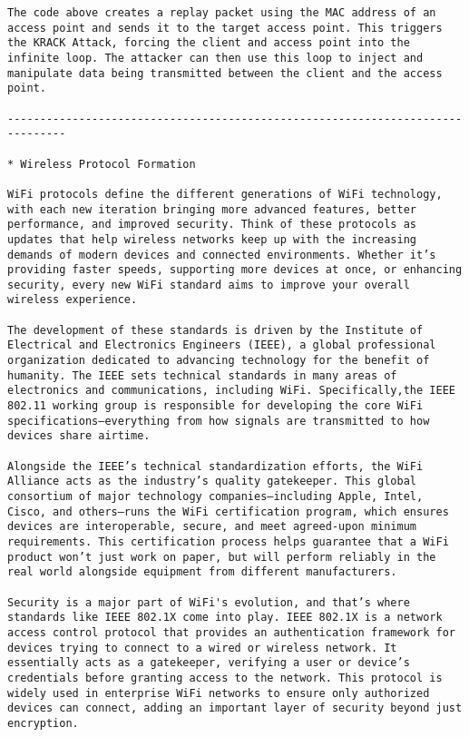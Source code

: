 \begin{verbatim}
The code above creates a replay packet using the MAC address of an access point and sends it to the target access point. This triggers the KRACK Attack, forcing the client and access point into the infinite loop. The attacker can then use this loop to inject and manipulate data being transmitted between the client and the access point.

-------------------------------------------------------------------------------

* Wireless Protocol Formation

WiFi protocols define the different generations of WiFi technology, with each new iteration bringing more advanced features, better performance, and improved security. Think of these protocols as updates that help wireless networks keep up with the increasing demands of modern devices and connected environments. Whether it’s providing faster speeds, supporting more devices at once, or enhancing security, every new WiFi standard aims to improve your overall wireless experience.

The development of these standards is driven by the Institute of Electrical and Electronics Engineers (IEEE), a global professional organization dedicated to advancing technology for the benefit of humanity. The IEEE sets technical standards in many areas of electronics and communications, including WiFi. Specifically,the IEEE 802.11 working group is responsible for developing the core WiFi specifications—everything from how signals are transmitted to how devices share airtime.

Alongside the IEEE’s technical standardization efforts, the WiFi Alliance acts as the industry’s quality gatekeeper. This global consortium of major technology companies—including Apple, Intel, Cisco, and others—runs the WiFi certification program, which ensures devices are interoperable, secure, and meet agreed-upon minimum requirements. This certification process helps guarantee that a WiFi product won’t just work on paper, but will perform reliably in the real world alongside equipment from different manufacturers.

Security is a major part of WiFi's evolution, and that’s where standards like IEEE 802.1X come into play. IEEE 802.1X is a network access control protocol that provides an authentication framework for devices trying to connect to a wired or wireless network. It essentially acts as a gatekeeper, verifying a user or device’s credentials before granting access to the network. This protocol is widely used in enterprise WiFi networks to ensure only authorized devices can connect, adding an important layer of security beyond just encryption.


\end{verbatim}
